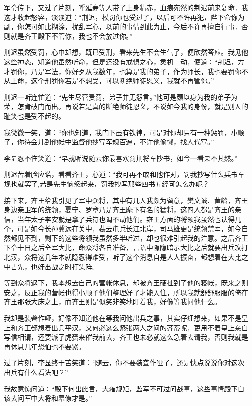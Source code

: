 军令传下，又过了片刻，呼延寿等人带了上身精赤，血痕宛然的荆迟前来复命，我这才收起怒容，淡淡道：“荆迟，杖罚你也受过了，以后可不许再犯，陛下命你为副，你怎可如此糊涂，扰乱军心，以前的事情到此为止，今后不许再擅自行事，否则就是齐王殿下不管你，我也不会放过你。”

荆迟虽然受罚，心中却想，既已受刑，看来先生不会生气了，便欣然答应。我见他这些神态，知道他虽然听命，但是还没有戒惧之心，灵机一动，便道：“荆迟，方才罚你，乃是军法，你好歹从我数年，也算是我的弟子，作为师长，我也要罚你不从上命，这个刑罚你若是不想受，可以断绝师徒恩义，我就不再管你。”

荆迟一听连忙道：“先生尽管责罚，弟子并无怨言。”他可是颇以身为我的弟子为荣，怎肯破门而出。再说若是真的断绝师徒恩义，不说如今我的身份，就是别人的耻笑也是受不起的。

我微微一笑，道：“你也知道，我门下虽有铁律，可是对你却只有一种惩罚，小顺子，你待会儿到他帐中监督他抄写军规百遍，不许他偷懒，找人代写。”

李显忍不住笑道：“早就听说随云你最喜欢罚荆将军抄书，如今一看果不其然。”

荆迟苦着脸应诺，看看齐王，心道：“我可再不敢和他作对，罚我抄写什么兵书军规也就罢了,若是先生恼怒起来，罚我抄写那些四书五经可怎么办呢？

接下来，齐王给我引见了军中众将，其中有几人我颇为留意，樊文诚、黄龄，齐王身边亲卫军的统领，夏宁、罗章乃是齐王麾下有名的猛将，这四人都是齐王的亲信，当年太子李安就是拿了兵符也调不动他们。雍王方面的将领我虽然也认得几个，可是如今长孙冀远在关中，裴云屯兵长江北岸，司马雄更是统领禁军，如今自然都见不到，剩下的这些将领我虽然多半听过，却也很难引起我的注意。之后齐王下令十日之后全军大比，命众将各自准备，言语中隐隐暗示大比之后就要出兵攻打北汉，众将这几年本就隐忍得难受，听了这个消息自是人人振奋，都想着在大比之中占先，也好出战之时打头阵。

等到众将退下，我本想去自己的营帐休息，却被齐王硬扯到了他的寝帐，既来之则安之，反正我的营帐也得小顺子他们整理好了才能入住，所以我就舒舒服服的倚在齐王那张大床之上，而齐王则是似笑非笑地盯着我，好像等我问他什么。

我却是装聋作哑，好像不知道他在等我问他出兵之事，其实仔细想来，如果不是皇上和齐王都想着出兵平汉，又何必这么紧张两人之间的芥蒂呢，更用不着皇上亲自写信相请，还要派了虎赍来催我前去，齐王也未必就这么急着去请我，否则我就是再休息几年恐怕也不要紧。

过了片刻，李显终于苦笑道：“随云，你不要装聋作哑了，还是快点说说你对这次出兵有什么看法吧？”

我故意惊问道：“殿下何出此言，大雍规矩，监军不可过问战事，这些事情殿下自该去问军中大将和幕僚才是。”

